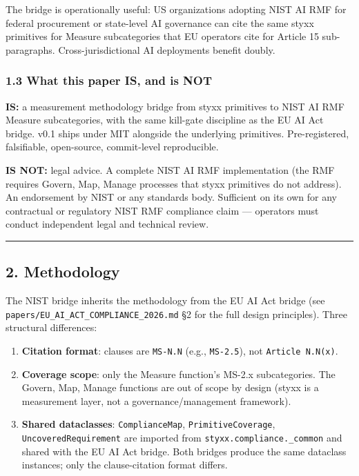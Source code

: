 \documentclass[
]{article}
\providecommand{\tightlist}{%
  \setlength{\itemsep}{0pt}\setlength{\parskip}{0pt}}
\begin{document}
The bridge is operationally useful: US organizations adopting NIST AI
RMF for federal procurement or state-level AI governance can cite the
same styxx primitives for Measure subcategories that EU operators cite
for Article 15 sub-paragraphs. Cross-jurisdictional AI deployments
benefit doubly.

\subsubsection{1.3 What this paper IS, and is
NOT}\label{what-this-paper-is-and-is-not}

\textbf{IS:} a measurement methodology bridge from styxx primitives to
NIST AI RMF Measure subcategories, with the same kill-gate discipline as
the EU AI Act bridge. v0.1 ships under MIT alongside the underlying
primitives. Pre-registered, falsifiable, open-source, commit-level
reproducible.

\textbf{IS NOT:} legal advice. A complete NIST AI RMF implementation
(the RMF requires Govern, Map, Manage processes that styxx primitives do
not address). An endorsement by NIST or any standards body. Sufficient
on its own for any contractual or regulatory NIST RMF compliance claim
--- operators must conduct independent legal and technical review.

\begin{center}\rule{0.5\linewidth}{0.5pt}\end{center}

\subsection{2. Methodology}\label{methodology}

The NIST bridge inherits the methodology from the EU AI Act bridge (see
\texttt{papers/EU\_AI\_ACT\_COMPLIANCE\_2026.md} §2 for the full design
principles). Three structural differences:

\begin{enumerate}
\def\labelenumi{\arabic{enumi}.}
\tightlist
\item
  \textbf{Citation format}: clauses are \texttt{MS-N.N} (e.g.,
  \texttt{MS-2.5}), not \texttt{Article\ N.N(x)}.
\item
  \textbf{Coverage scope}: only the Measure function's MS-2.x
  subcategories. The Govern, Map, Manage functions are out of scope by
  design (styxx is a measurement layer, not a governance/management
  framework).
\item
  \textbf{Shared dataclasses}: \texttt{ComplianceMap},
  \texttt{PrimitiveCoverage}, \texttt{UncoveredRequirement} are imported
  from \texttt{styxx.compliance.\_common} and shared with the EU AI Act
  bridge. Both bridges produce the same dataclass instances; only the
  clause-citation format differs.
\end{enumerate}
\end{document}
